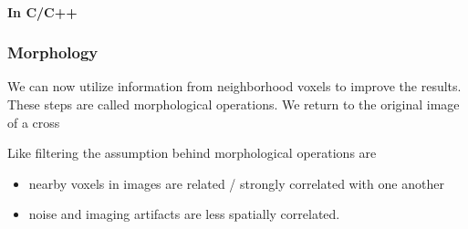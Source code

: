 \documentclass[letterpaper,10pt,english]{sphinxmanual}
\begin{document}
\paragraph{In C/C++}
\label{\detokenize{04-BasicSegmentation_Part2:in-c-c}}
\begin{sphinxVerbatim}[commandchars=\\\{\}]
      

 
   
      
       
      \PYG{p}{[}\PYG{p}{]}\PYG{p}{[}\PYG{p}{]}
\end{sphinxVerbatim}


\subsubsection{Morphology}
\label{\detokenize{04-BasicSegmentation_Part2:morphology}}
\sphinxAtStartPar
We can now utilize information from neighborhood voxels to improve the results. These steps are called morphological operations. We return to the original image of a cross

\sphinxAtStartPar
Like filtering the assumption behind morphological operations are
\begin{itemize}
\item {} 
\sphinxAtStartPar
nearby voxels in  images are related / strongly correlated with one another

\item {} 
\sphinxAtStartPar
noise and imaging artifacts are less spatially correlated.

\end{itemize}
\end{document}
